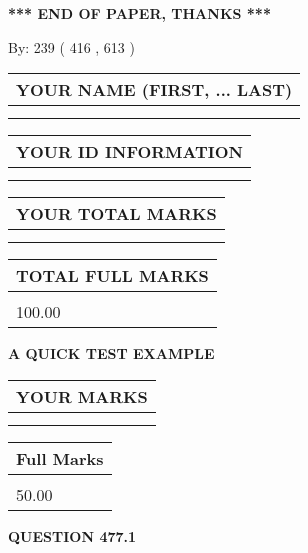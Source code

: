\documentclass[12pt]{article}
\begin{document}
\vspace{1.0in} 
{\textbf{\large{ *** END OF PAPER, THANKS *** }}} 
   
   
\hspace{1.0in} By: 
 239 ( 416 ,  613 )
   
   
   
   
\newpage 
\setcounter{page}{ 
   477001 } 
   
   
   
   
\noindent\begin{tabular}{|l|}
\hline
YOUR NAME (FIRST, ... LAST)  \\
\hline
 \\ 
 \\ 
\hline
\end{tabular}
\hspace{0.05in} \begin{tabular}{|l|}
\hline
 YOUR   ID   INFORMATION  \\
\hline
 \\ 
 \\ 
\hline
\end{tabular}
   
   
\vspace{0.2in}\noindent\begin{tabular}{|l|}
\hline
YOUR TOTAL MARKS  \\
\hline
 \\ 
 \\ 
\hline
\end{tabular}
\hspace{0.05in} \begin{tabular}{|l|}
\hline
TOTAL FULL MARKS  \\
\hline
 \\ 
100.00 \\
\hline
\end{tabular}
   
   
 \vspace{0.2in}
{\LARGE {\textbf{ A QUICK TEST EXAMPLE}}}
   
   
  
\vspace{0.2in}
  
\noindent\begin{tabular}{|l|}
\hline
 YOUR MARKS  \\
\hline
 \\ 
 \\ 
\hline
\end{tabular}
\hspace{0.05in} \begin{tabular}{|l|}
\hline
 Full Marks  \\
\hline
 \\ 
50.00 \\
\hline
\end{tabular}
{\textbf{\Large{QUESTION
477.1 
}}}
  
\end{document}

